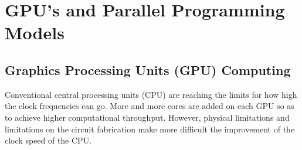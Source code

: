 \chapter{GPU’s and Parallel Programming Models}


\section{Graphics Processing Units (GPU) Computing}
Conventional central processing units (CPU) are reaching the limits for how high the clock frequencies can go. More and more cores are added on each GPU so as to achieve higher computational throughput. However, physical limitations and limitations on the circuit fabrication make more difficult the improvement of the clock speed of the CPU.

